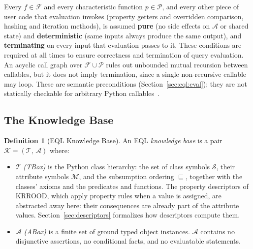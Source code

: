 \documentclass[11pt, a4paper]{article}
\theoremstyle{plain}
\theoremstyle{definition}
\newtheorem{definition}[theorem]{Definition}
\theoremstyle{remark}
\begin{document}
Every $f \in \mathcal{F}$ and every characteristic function $p \in \mathcal{P}$, and every other
piece of user code that evaluation invokes (property getters and overridden comparison, hashing
and iteration methods), is assumed
\textbf{pure} (no side effects on $\mathcal{A}$ or shared state) and \textbf{deterministic}
(same inputs always produce the same output), and \textbf{terminating} on every input
that evaluation passes to it.  These conditions are required at all times to ensure
correctness and termination of query evaluation.  An acyclic call graph over
$\mathcal{F} \cup \mathcal{P}$ rules out unbounded mutual recursion between callables, but it
does not imply termination, since a single non-recursive callable may loop.  These are
semantic preconditions (Section~\ref{sec:eql:eval}); they are not statically checkable for
arbitrary Python callables~\cite{rice1953classes}.

\subsection{The Knowledge Base}

\begin{definition}[EQL Knowledge Base]
\label{def:kb}
An EQL \emph{knowledge base} is a pair $\mathcal{K} = (\mathcal{T},\,\mathcal{A})$ where:
\begin{itemize}
  \item $\mathcal{T}$ \emph{(TBox)} is the Python class hierarchy: the set of class symbols
        $\mathcal{S}$, their attribute symbols $\mathcal{M}$, and the subsumption ordering
        $\sqsubseteq$, together with the classes' axioms and the predicates and functions.  The
        property descriptors of KRROOD, which apply property rules when a value is assigned, are
        abstracted away here: their consequences are already part of the attribute values.
        Section~\ref{sec:descriptors} formalizes how descriptors compute them.

  \item $\mathcal{A}$ \emph{(ABox)} is a finite set of ground typed object
        instances.  $\mathcal{A}$ contains no disjunctive
        assertions, no conditional facts, and no evaluatable statements.
\end{itemize}
\end{definition}

\end{document}
